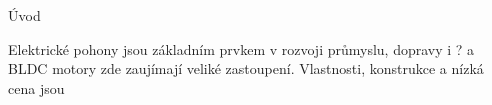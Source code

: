 
\def\ctustyle{{\ssr CTUstyle}}
\def\ttb{\tt\char`\\} %

\chap Úvod


Elektrické pohony jsou základním prvkem v rozvoji průmyslu, dopravy i ? a 
BLDC motory zde zaujímají veliké zastoupení.  Vlastnosti, konstrukce a nízká cena
 jsou 


